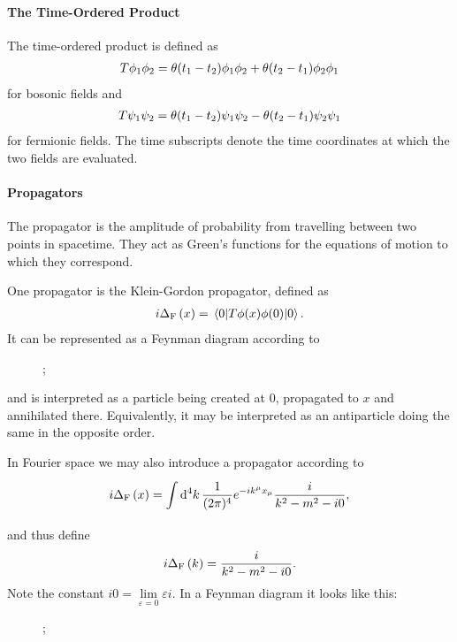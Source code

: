 \paragraph{The Time-Ordered Product}
The time-ordered product is defined as
\begin{align}
	T\phi_{1}\phi_{2} = \theta(t_{1} - t_{2})\phi_{1}\phi_{2} + \theta(t_{2} - t_{1})\phi_{2}\phi_{1}
\end{align}
for bosonic fields and
\begin{align*}
	T\psi_{1}\psi_{2} = \theta(t_{1} - t_{2})\psi_{1}\psi_{2} - \theta(t_{2} - t_{1})\psi_{2}\psi_{1}
\end{align*}
for fermionic fields. The time subscripts denote the time coordinates at which the two fields are evaluated.

\paragraph{Propagators}
The propagator is the amplitude of probability from travelling between two points in spacetime. They act as Green's functions for the equations of motion to which they correspond.

One propagator is the Klein-Gordon propagator, defined as
\begin{align*}
	i\Delta_{\text{F}}\left(x\right) = \expval{\ensuremath{T\phi(x)\phi(0)}}{0}.
\end{align*}
It can be represented as a Feynman diagram according to
\begin{figure}[!ht]
	\centering
	;
\end{figure}
and is interpreted as a particle being created at $0$, propagated to $x$ and annihilated there. Equivalently, it may be interpreted as an antiparticle doing the same in the opposite order.

In Fourier space we may also introduce a propagator according to
\begin{align*}
	i\Delta_{\text{F}}\left(x\right) = \int\limits_{}^{}\dd[4]{k}\frac{1}{(2\pi)^{4}}e^{-ik^{\mu}x_{\mu}}\frac{i}{k^{2} - m^{2} - i0},
\end{align*}
and thus define
\begin{align*}
	i\Delta_{\text{F}}\left(k\right) = \frac{i}{k^{2} - m^{2} - i0}.
\end{align*}
Note the constant $i0 = \lim\limits_{\varepsilon = 0}\varepsilon i$. In a Feynman diagram it looks like this:
\begin{figure}[!ht]
	\centering
	;
\end{figure}

